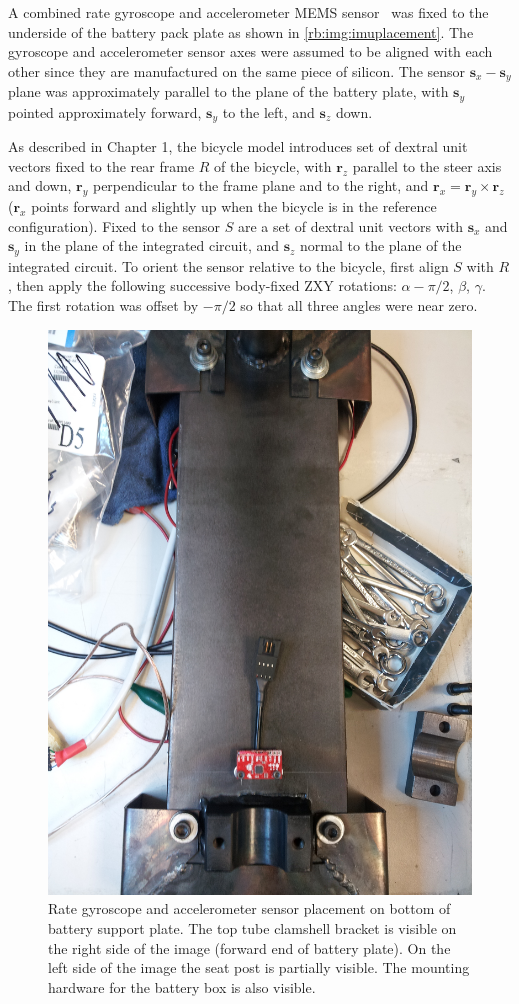 A combined rate gyroscope and accelerometer MEMS
sensor~\cite{InvensenseMPU6050} was fixed to the underside of the battery pack
plate as shown in \autoref{rb:img:imuplacement}. The gyroscope and
accelerometer sensor axes were assumed to be aligned with each other since they
are manufactured on the same piece of silicon. The sensor $\bm{s}_x-\bm{s}_y$
plane was approximately parallel to the plane of the battery plate, with
$\bm{s}_y$ pointed approximately forward, $\bm{s}_y$ to the left, and
$\bm{s}_z$ down.

As described in Chapter 1, the bicycle model introduces set of dextral unit
vectors fixed to the rear frame $R$ of the bicycle, with $\bm{r}_z$ parallel to
the steer axis and down, $\bm{r}_y$ perpendicular to the frame plane and to the
right, and $\bm{r}_x = \bm{r}_y \times \bm{r}_z$ ($\bm{r}_x$ points forward and
slightly up when the bicycle is in the reference configuration). Fixed to the sensor $S$
are a set of dextral unit vectors with $\bm{s}_x$ and $\bm{s}_y$ in the plane
of the integrated circuit, and $\bm{s}_z$ normal to the plane of the integrated
circuit. To orient the sensor relative to the bicycle, first align $S$ with
$R$, then apply the following successive body-fixed ZXY rotations: $\alpha -
\pi/2$, $\beta$, $\gamma$. The first rotation was offset by $-\pi/2$ so that
all three angles were near zero.

\begin{figure}[htbp]
  \centering
  \includegraphics[width=.6\textwidth,angle=90]{images/IMG_20130325_195226.jpg}
  \caption{Rate gyroscope and accelerometer sensor placement on bottom of
  battery support plate. The top tube clamshell bracket is visible on the right side of
the image (forward end of battery plate). On the left side of the image the
seat post is partially visible. The mounting hardware for the battery box is also
visible.}
  \label{rb:img:imuplacement}
\end{figure}

